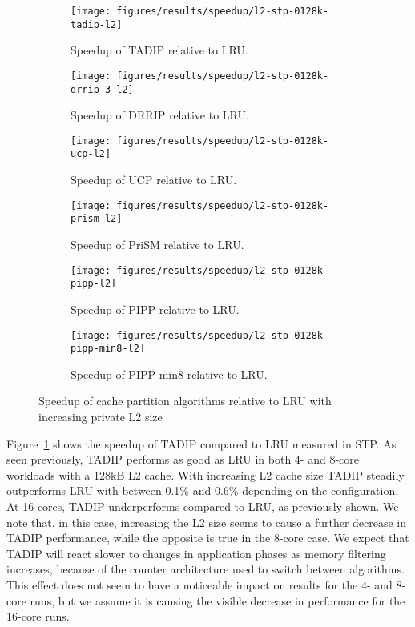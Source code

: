 \begin{figure}[!th]
    \centering
    \begin{subfigure}[b]{0.5\textwidth}
        \texttt{[image: figures/results/speedup/l2-stp-0128k-tadip-l2]}
        \caption{Speedup of TADIP relative to LRU.}
        \label{fig:results:l2:tadip}
    \end{subfigure}%
    \begin{subfigure}[b]{0.5\textwidth}
        \texttt{[image: figures/results/speedup/l2-stp-0128k-drrip-3-l2]}
        \caption{Speedup of DRRIP relative to LRU.}
        \label{fig:results:l2:drrip}
    \end{subfigure}
    \begin{subfigure}[b]{0.5\textwidth}
        \texttt{[image: figures/results/speedup/l2-stp-0128k-ucp-l2]}
        \caption{Speedup of UCP relative to LRU.}
        \label{fig:results:l2:ucp}
    \end{subfigure}%
    \begin{subfigure}[b]{0.5\textwidth}
        \texttt{[image: figures/results/speedup/l2-stp-0128k-prism-l2]}
        \caption{Speedup of PriSM relative to LRU.}
        \label{fig:results:l2:prism}
    \end{subfigure}
    \begin{subfigure}[b]{0.5\textwidth}
        \texttt{[image: figures/results/speedup/l2-stp-0128k-pipp-l2]}
        \caption{Speedup of PIPP relative to LRU.}
        \label{fig:results:l2:pipp}
    \end{subfigure}%
    \begin{subfigure}[b]{0.5\textwidth}
        \texttt{[image: figures/results/speedup/l2-stp-0128k-pipp-min8-l2]}
        \caption{Speedup of PIPP-min8 relative to LRU.}
        \label{fig:results:l2:pipp-min8}
    \end{subfigure}
    \caption[Speedup with increasing L2 size]{Speedup of cache partition algorithms relative to LRU with increasing private L2 size}
    \label{fig:results:l2}
\end{figure}

Figure~\ref{fig:results:l2:tadip} shows the speedup of TADIP compared to LRU measured in STP. 
As seen previously, TADIP performs as good as LRU in both 4- and 8-core workloads with a 128kB L2 cache.
With increasing L2 cache size TADIP steadily outperforms LRU with between 0.1\% and 0.6\% depending on the configuration. 
At 16-cores, TADIP underperforms compared to LRU, as previously shown.
We note that, in this case, increasing the L2 size seems to cause a further decrease in TADIP performance, while the opposite is true in the 8-core case.
We expect that TADIP will react slower to changes in application phases as memory filtering increases, because of the counter architecture used to switch between algorithms.
This effect does not seem to have a noticeable impact on results for the 4- and 8-core runs, but we assume it is causing the visible decrease in performance for the 16-core runs.

